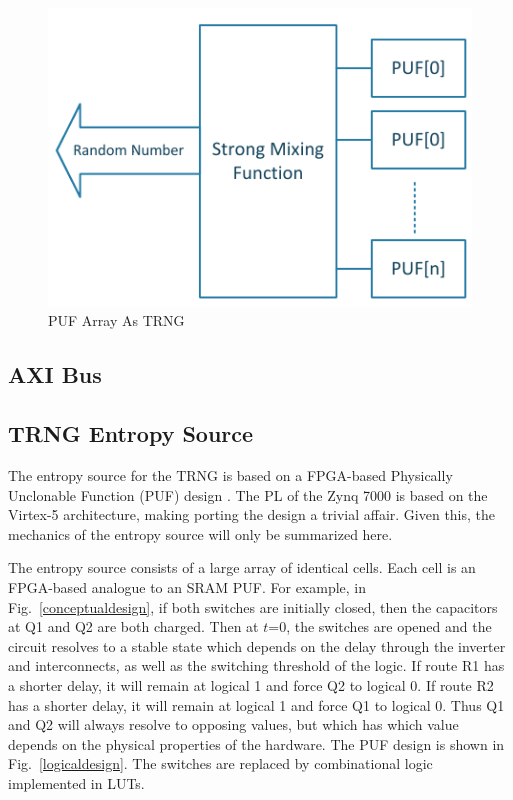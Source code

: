 \documentclass[journal]{IEEEtran}
\begin{document}
\begin{figure}[!th]
\centering
\includegraphics[scale=.75]{Images/trng.pdf}
\caption{PUF Array As TRNG }
\label{fig:trng}
\end{figure} 




\subsection{AXI Bus}

\subsection{TRNG Entropy Source}

The entropy source for the TRNG is based on a FPGA-based Physically Unclonable Function (PUF) design \cite{fpga_puf}. The PL of the Zynq 7000 is based on the Virtex-5 architecture, making porting the design a trivial affair. Given this,  the mechanics of the entropy source will only be summarized here. 

The entropy source consists of a large array of identical cells. Each cell is an FPGA-based analogue to an SRAM PUF. For example, in Fig.~\ref{conceptualdesign}, if both switches are initially closed, then the capacitors at Q1 and Q2 are both charged. Then at $t$=0, the switches are opened and the circuit resolves to a stable state which depends on the  delay through the inverter and interconnects, as well as the switching threshold of the logic. If route R1 has a shorter delay, it will remain at logical 1 and force Q2 to logical 0. If route R2 has a shorter delay, it will remain at logical 1 and force Q1 to logical 0. Thus Q1 and Q2 will always resolve to opposing values, but which has which value depends on the physical properties of the hardware.  The PUF design is shown in Fig.~\ref{logicaldesign}.  The switches are replaced by combinational logic implemented in LUTs.
\end{document}
